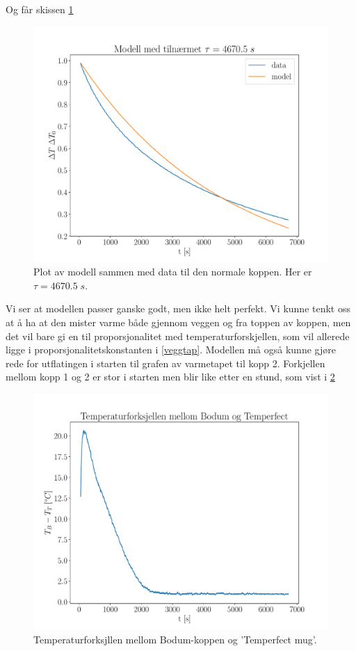 \documentclass[ reprint, amsmath,amssymb, aps]{revtex4-2}
\begin{document}
Og får skissen \ref{plotm1Rep}

\begin{figure}
\centering
\includegraphics[scale=0.35]{modellttau.pdf}
\caption{Plot av modell sammen med data til den normale koppen. Her er $\tau = 4670.5 \; s$.}
\label{plotm1Rep}
\end{figure}

Vi ser at modellen passer ganske godt, men ikke helt perfekt. Vi kunne tenkt oss at å ha at den mister varme både gjennom veggen og fra toppen av koppen, men det vil bare gi en til proporsjonalitet med temperaturforskjellen, som vil allerede ligge i proporsjonalitetskonstanten i \ref{veggtap}. Modellen må også kunne gjøre rede for utflatingen i starten til grafen av varmetapet til kopp 2. Forkjellen mellom kopp 1 og 2 er stor i starten men blir like etter en stund, som vist i \ref{tempdifRep} 

\begin{figure}
\centering
\includegraphics[scale=0.35]{tempzoomedout.pdf}
\caption{Temperaturforksjllen mellom Bodum-koppen og 'Temperfect mug'.}
\label{tempdifRep}
\end{figure}
\end{document}
